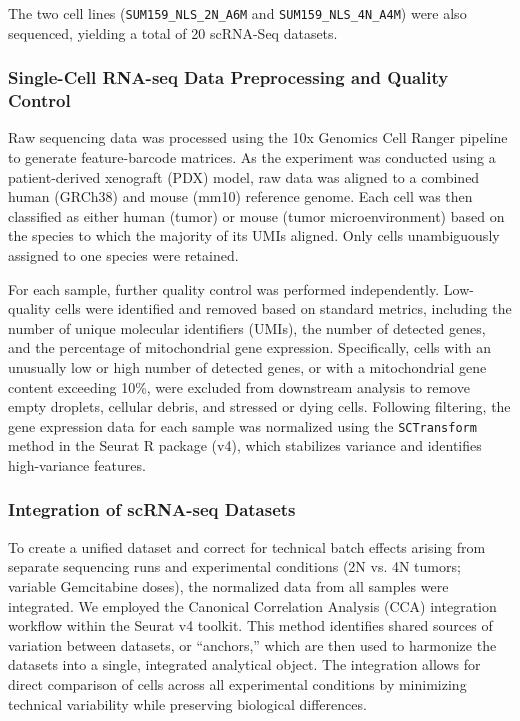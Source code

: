 \documentclass{article}
\begin{document}
The two cell lines (\texttt{SUM159\_NLS\_2N\_A6M} and \texttt{SUM159\_NLS\_4N\_A4M}) were also sequenced, yielding a total of 20 scRNA-Seq datasets.


\subsubsection{Single-Cell RNA-seq Data Preprocessing and Quality Control}
Raw sequencing data was processed using the 10x Genomics Cell Ranger pipeline to generate feature-barcode matrices. As the experiment was conducted using a patient-derived xenograft (PDX) model, raw data was aligned to a combined human (GRCh38) and mouse (mm10) reference genome. Each cell was then classified as either human (tumor) or mouse (tumor microenvironment) based on the species to which the majority of its UMIs aligned. Only cells unambiguously assigned to one species were retained. 

For each sample, further quality control was performed independently. Low-quality cells were identified and removed based on standard metrics, including the number of unique molecular identifiers (UMIs), the number of detected genes, and the percentage of mitochondrial gene expression. Specifically, cells with an unusually low or high number of detected genes, or with a mitochondrial gene content exceeding 10\%, were excluded from downstream analysis to remove empty droplets, cellular debris, and stressed or dying cells. Following filtering, the gene expression data for each sample was normalized using the \texttt{SCTransform} method in the Seurat R package (v4), which stabilizes variance and identifies high-variance features.

\subsubsection{Integration of scRNA-seq Datasets}
To create a unified dataset and correct for technical batch effects arising from separate sequencing runs and experimental conditions (2N vs. 4N tumors; variable Gemcitabine doses), the normalized data from all samples were integrated. We employed the Canonical Correlation Analysis (CCA) integration workflow within the Seurat v4 toolkit. This method identifies shared sources of variation between datasets, or ``anchors,'' which are then used to harmonize the datasets into a single, integrated analytical object. The integration allows for direct comparison of cells across all experimental conditions by minimizing technical variability while preserving biological differences.
\end{document}
